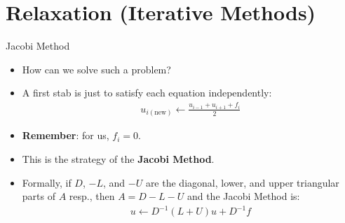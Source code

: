 \documentclass{beamer}
\begin{document}
\section{Relaxation (Iterative Methods)}%

\begin{frame}{Jacobi Method}
 \begin{itemize}
  \item How can we solve such a problem?
  \item A first stab is just to satisfy each equation independently:
  \begin{align}
   u_{i(\text{new})} \leftarrow \frac{u_{i-1}+u_{i+1}+f_i}{2}
  \end{align}
  \item \textbf{Remember}: for us, $f_i=0$.
  \item This is the strategy of the \textbf{Jacobi Method}.
  \item Formally, if $D$, $-L$, and $-U$ are the diagonal, lower, and upper
        triangular parts of $A$ resp., then $A=D-L-U$ and the Jacobi Method is:
  \begin{align}
   u \leftarrow D^{-1}(L+U)u+D^{-1}f
  \end{align}
 \end{itemize}
\end{frame}
\end{document}
